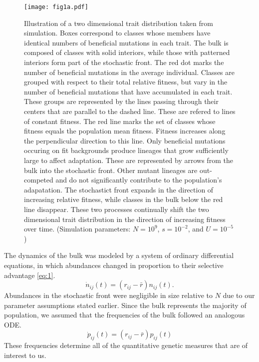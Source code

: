 \documentclass[11pt,twocolumn]{article}
\begin{document}
\begin{figure}[h!]
\texttt{[image: fig1a.pdf]}
\caption{\footnotesize Illustration of a two dimensional trait distribution taken from simulation. Boxes correspond to classes whose members have identical numbers of beneficial mutations in each trait. The bulk is composed of classes with solid interiors, while those with patterned interiors form part of the stochastic front. The red dot marks the number of beneficial mutations in the average individual. Classes are grouped with respect to their total relative fitness, but vary in the number of beneficial mutations that have accumulated in each trait. These groups are represented by the lines passing through their centers that are parallel to the dashed line. These are refered to lines of constant fitness. The red line marks the set of classes whose fitness equals the population mean fitness. Fitness increases along the perpendicular direction to this line. Only beneficial mutations occuring on fit backgrounds produce lineages that grow sufficiently large to affect adaptation. These are represented by arrows from the bulk into the stochastic front. Other mutant lineages are out-competed and do not significantly contribute to the population's adapatation. The stochastict front expands in the direction of increasing relative fitness, while classes in the bulk below the red line disappear. These two processes continually shift the two dimensional trait distribution in the direction of increasing fitness over time. (Simulation parameters: $N=10^9$, $s=10^{-2}$, and $U=10^{-5}$)}\label{fig:1}
\end{figure}


The dynamics of the bulk was modeled by a system of ordinary differential equations, in which abundances changed in proportion to their selective advantage \eqref{eq:1}. 
\begin{equation} \label{eq:1}
\dot{n}_{ij}(t) = (r_{ij}-\bar{r}) n_{ij}(t). 
\end{equation}
Abundances in the stochastic front were negligible in size relative to $N$ due to our parameter assumptions stated earlier.  Since the bulk represents the majority of population, we assumed that the frequencies of the bulk followed an analogous ODE.
\begin{equation} \label{eq:2}
\dot{p}_{ij}(t) = (r_{ij}-\bar{r}) p_{ij}(t) 
\end{equation}
These frequencies determine all of the quantitative genetic measures that are of interest to us.\par
\end{document}
